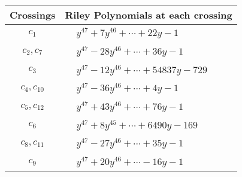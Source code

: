 \documentclass[1p]{elsarticle_modified}
\theoremstyle{definition}
\begin{document}
\begin{tabular}{m{50pt}|m{274pt}}
Crossings & \hspace{64pt}Riley Polynomials at each crossing \\
\hline $$\begin{aligned}c_{1}\end{aligned}$$&$\begin{aligned}
&y^{47}+7 y^{46}+\cdots+22 y-1
\end{aligned}$\\
\hline $$\begin{aligned}c_{2},c_{7}\end{aligned}$$&$\begin{aligned}
&y^{47}-28 y^{46}+\cdots+36 y-1
\end{aligned}$\\
\hline $$\begin{aligned}c_{3}\end{aligned}$$&$\begin{aligned}
&y^{47}-12 y^{46}+\cdots+54837 y-729
\end{aligned}$\\
\hline $$\begin{aligned}c_{4},c_{10}\end{aligned}$$&$\begin{aligned}
&y^{47}-36 y^{46}+\cdots+4 y-1
\end{aligned}$\\
\hline $$\begin{aligned}c_{5},c_{12}\end{aligned}$$&$\begin{aligned}
&y^{47}+43 y^{46}+\cdots+76 y-1
\end{aligned}$\\
\hline $$\begin{aligned}c_{6}\end{aligned}$$&$\begin{aligned}
&y^{47}+8 y^{45}+\cdots+6490 y-169
\end{aligned}$\\
\hline $$\begin{aligned}c_{8},c_{11}\end{aligned}$$&$\begin{aligned}
&y^{47}-27 y^{46}+\cdots+35 y-1
\end{aligned}$\\
\hline $$\begin{aligned}c_{9}\end{aligned}$$&$\begin{aligned}
&y^{47}+20 y^{46}+\cdots-16 y-1
\end{aligned}$\\
\hline
\end{tabular}\\~\\
\end{document}
